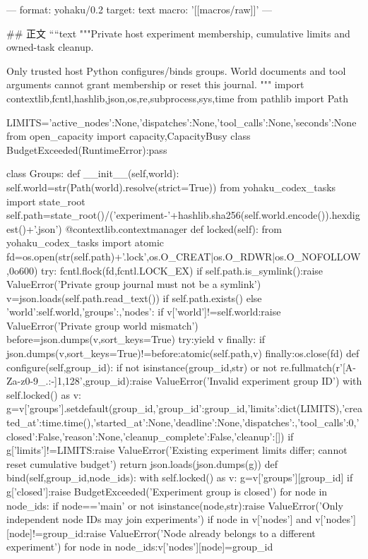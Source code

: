 ---
format: yohaku/0.2
target: text
macro: '[[macros/raw]]'
---

## 正文
````text
"""Private host experiment membership, cumulative limits and owned-task cleanup.

Only trusted host Python configures/binds groups. World documents and tool
arguments cannot grant membership or reset this journal.
"""
import contextlib,fcntl,hashlib,json,os,re,subprocess,sys,time
from pathlib import Path

LIMITS={'active_nodes':None,'dispatches':None,'tool_calls':None,'seconds':None}
from open_capacity import capacity,CapacityBusy
class BudgetExceeded(RuntimeError):pass

class Groups:
 def __init__(self,world):
  self.world=str(Path(world).resolve(strict=True))
  from yohaku_codex_tasks import state_root
  self.path=state_root()/('experiment-'+hashlib.sha256(self.world.encode()).hexdigest()+'.json')
 @contextlib.contextmanager
 def locked(self):
  from yohaku_codex_tasks import atomic
  fd=os.open(str(self.path)+'.lock',os.O_CREAT|os.O_RDWR|os.O_NOFOLLOW,0o600)
  try:
   fcntl.flock(fd,fcntl.LOCK_EX)
   if self.path.is_symlink():raise ValueError('Private group journal must not be a symlink')
   v=json.loads(self.path.read_text()) if self.path.exists() else {'world':self.world,'groups':{},'nodes':{}}
   if v['world']!=self.world:raise ValueError('Private group world mismatch')
   before=json.dumps(v,sort_keys=True)
   try:yield v
   finally:
    if json.dumps(v,sort_keys=True)!=before:atomic(self.path,v)
  finally:os.close(fd)
 def configure(self,group_id):
  if not isinstance(group_id,str) or not re.fullmatch(r'[A-Za-z0-9_.:-]{1,128}',group_id):raise ValueError('Invalid experiment group ID')
  with self.locked() as v:
   g=v['groups'].setdefault(group_id,{'group_id':group_id,'limits':dict(LIMITS),'created_at':time.time(),'started_at':None,'deadline':None,'dispatches':{},'tool_calls':0,'closed':False,'reason':None,'cleanup_complete':False,'cleanup':[]})
   if g['limits']!=LIMITS:raise ValueError('Existing experiment limits differ; cannot reset cumulative budget')
   return json.loads(json.dumps(g))
 def bind(self,group_id,node_ids):
  with self.locked() as v:
   g=v['groups'][group_id]
   if g['closed']:raise BudgetExceeded('Experiment group is closed')
   for node in node_ids:
    if node=='main' or not isinstance(node,str):raise ValueError('Only independent node IDs may join experiments')
    if node in v['nodes'] and v['nodes'][node]!=group_id:raise ValueError('Node already belongs to a different experiment')
   for node in node_ids:v['nodes'][node]=group_id
